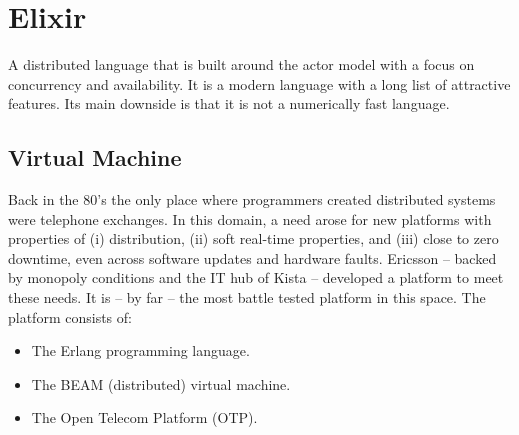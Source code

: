 {
\setmonofont[
  Contextuals={Alternate}
]{Fira Code}

\section{Elixir}
\label{lang:elixir}

A distributed language that is built around the actor model with a focus on concurrency and availability. It is a modern language with a long list of attractive features. Its main downside is that it is not a numerically fast language.

\subsection{Virtual Machine}

Back in the 80's the only place where programmers created distributed systems were telephone exchanges. In this domain, a need arose for new platforms with properties of (i) distribution, (ii) soft real-time properties, and (iii) close to zero downtime, even across software updates and hardware faults. Ericsson -- backed by monopoly conditions and the IT hub of Kista -- developed a platform to meet these needs. It is -- by far -- the most battle tested platform in this space. The platform consists of:
\begin{itemize}
  \item The Erlang programming language.
  \item The BEAM (distributed) virtual machine.
  \item The Open Telecom Platform (OTP).
\end{itemize}

}

